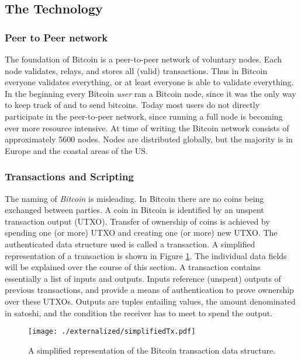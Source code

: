 \subsection{The Technology}
\label{sec:btc_tech}

\subsubsection{Peer to Peer network}
\label{sec:p2p}

The foundation of Bitcoin is a peer-to-peer network of voluntary nodes. Each node validates, relays, and stores all (valid) transactions. Thus in Bitcoin everyone validates everything, or at least everyone is able to validate everything. In the beginning every Bitcoin \emph{user} ran a Bitcoin node, since it was the only way to keep track of and to send bitcoins. Today most users do not directly participate in the peer-to-peer network, since running a full node is becoming ever more resource intensive. At time of writing the Bitcoin network consists of approximately 5600 nodes. Nodes are distributed globally, but the majority is in Europe and the coastal areas of the US. 

\cite{DonetDonet2014}


\subsubsection{Transactions and Scripting}
\label{sec:tx}

The naming of \emph{Bitcoin} is misleading. In Bitcoin there are no coins being exchanged between parties. A coin in Bitcoin is identified by an unspent transaction output (UTXO). Transfer of ownership of coins is achieved by spending one (or more) UTXO and creating one (or more) new UTXO.
The authenticated data structure used is called a transaction. A simplified representation of a transaction is shown in Figure \ref{fig:bitcointx}. The individual data fields will be explained over the course of this section.
 A transaction contains essentially a list of inputs and outputs. Inputs reference (unspent) outputs of previous transactions, and provide a means of authentication to prove ownership over these UTXOs. Outputs are tuples entailing values, the amount denominated in satoshi, and the condition the receiver has to meet to spend the output. 

\begin{figure}
\centering
\texttt{[image: ./externalized/simplifiedTx.pdf]}
\caption{A simplified representation of the Bitcoin transaction data structure.}
\label{fig:bitcointx}
\end{figure}

